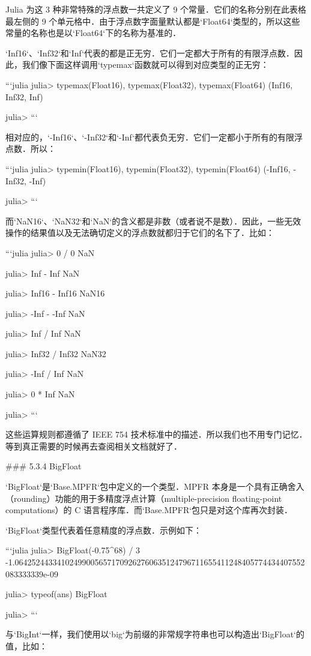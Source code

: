Julia 为这 3 种非常特殊的浮点数一共定义了 9 个常量．它们的名称分别在此表格最左侧的 9 个单元格中．由于浮点数字面量默认都是`Float64`类型的，所以这些常量的名称也是以`Float64`下的名称为基准的．

`Inf16`、`Inf32`和`Inf`代表的都是正无穷．它们一定都大于所有的有限浮点数．因此，我们像下面这样调用`typemax`函数就可以得到对应类型的正无穷：

```julia
julia> typemax(Float16), typemax(Float32), typemax(Float64)
(Inf16, Inf32, Inf)

julia> 
```

相对应的，`-Inf16`、`-Inf32`和`-Inf`都代表负无穷．它们一定都小于所有的有限浮点数．所以：

```julia
julia> typemin(Float16), typemin(Float32), typemin(Float64)
(-Inf16, -Inf32, -Inf)

julia> 
```

而`NaN16`、`NaN32`和`NaN`的含义都是非数（或者说不是数）．因此，一些无效操作的结果值以及无法确切定义的浮点数就都归于它们的名下了．比如：

```julia
julia> 0 / 0
NaN

julia> Inf - Inf
NaN

julia> Inf16 - Inf16
NaN16

julia> -Inf - -Inf
NaN

julia> Inf / Inf
NaN

julia> Inf32 / Inf32
NaN32

julia> -Inf / Inf
NaN

julia> 0 * Inf
NaN

julia> 
```

这些运算规则都遵循了 IEEE 754 技术标准中的描述．所以我们也不用专门记忆．等到真正需要的时候再去查阅相关文档就好了．

### 5.3.4 BigFloat

`BigFloat`是`Base.MPFR`包中定义的一个类型．MPFR 本身是一个具有正确舍入（rounding）功能的用于多精度浮点计算（multiple-precision floating-point computations）的 C 语言程序库．而`Base.MPFR`包只是对这个库再次封装．

`BigFloat`类型代表着任意精度的浮点数．示例如下：

```julia
julia> BigFloat(-0.75^68) / 3
-1.064252443341024990056571709262760635124796711655411248405774434407552083333339e-09

julia> typeof(ans)
BigFloat

julia> 
```

与`BigInt`一样，我们使用以`big`为前缀的非常规字符串也可以构造出`BigFloat`的值，比如：


